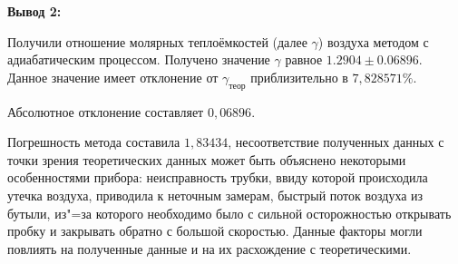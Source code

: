 \textbf{Вывод 2:}

Получили отношение молярных теплоёмкостей (далее $\gamma$) воздуха методом с адиабатическим процессом. Получено значение $\gamma$ равное $1.2904 \pm 0.06896$. Данное значение имеет отклонение от $\gamma_\text{теор}$ приблизительно в $7,828571\%$. 

Абсолютное отклонение составляет $0,06896$. 

Погрешность метода составила $1,83434$, несоответствие полученных данных с точки зрения теоретических данных может быть объяснено некоторыми особенностями прибора: неисправность трубки, ввиду которой происходила утечка воздуха, приводила к неточным замерам, быстрый поток воздуха из бутыли, из"=за которого необходимо было с сильной осторожностью открывать пробку и закрывать обратно с большой скоростью. Данные факторы могли повлиять на полученные данные и на их расхождение с теоретическими.
















